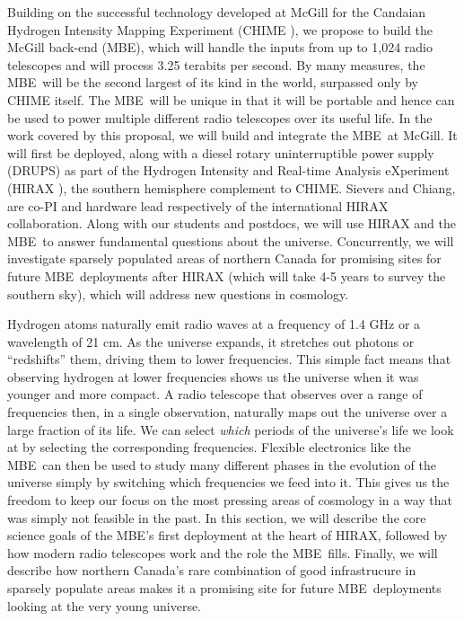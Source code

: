 \documentclass[letterpaper,11pt,preprint]{aastex}
\makeatletter
\newcommand{\mbe}{{\rm MBE}}
\def\section{\@startsection {section}{1}{\z@}{1.0ex plus 
1ex minus .2ex}{.2ex plus .2ex}{\large\bf}}
\makeatother
\begin{document}
Building on the successful technology developed at McGill for the
Candaian Hydrogen Intensity Mapping Experiment (CHIME
\citet{Bandura16}), we propose to build the McGill back-end (\mbe),
which will handle the inputs from up to 1,024 radio telescopes and
will process 3.25 terabits per second.  By many measures, the
\mbe\ will be the second largest of its kind in the world, surpassed
only by CHIME itself.  The \mbe\ will be unique in that it will be
portable and hence can be used to power multiple different radio
telescopes over its useful life. In the work covered by this proposal,
we will build and integrate the \mbe\ at McGill.  It will first be
deployed, along with a diesel rotary uninterruptible power supply
(DRUPS) as part of the Hydrogen Intensity and Real-time Analysis
eXperiment (HIRAX \citet{Newburgh16}), the southern hemisphere
complement to CHIME.
Sievers and Chiang, are co-PI and hardware lead respectively of the
international HIRAX collaboration.  Along with our students and
postdocs, we will use HIRAX and the \mbe\ to answer fundamental questions
about the universe.
Concurrently, we will investigate sparsely populated areas of northern
Canada for promising sites for future \mbe\ deployments after HIRAX
(which will take 4-5 years to survey the southern sky),
which will address new questions in cosmology.

\section{Research/Technology Development}

Hydrogen atoms naturally emit radio waves at a frequency of 1.4 GHz or
a wavelength of 21 cm.  As the universe expands, it stretches out
photons or ``redshifts'' them, driving them to lower frequencies.
This simple fact means that observing hydrogen at lower frequencies
shows us the universe when it was younger and more compact.  A radio
telescope that observes over a range of frequencies then, in a single
observation, naturally maps out the universe over a large fraction of
its life.  We can select {\it{which}} periods of the universe's life
we look at by selecting the corresponding frequencies.  Flexible
electronics like the \mbe\ can then be used to study many different
phases in the evolution of the universe simply by switching which
frequencies we feed into it.  This gives us the freedom to keep our
focus on the most pressing areas of cosmology in a way that was simply
not feasible in the past.  In this section, we will describe the core
science goals of the \mbe's first deployment at the heart of HIRAX,
followed by how modern radio telescopes work and the role the \mbe\ 
fills.  Finally, we will describe how northern Canada's rare
combination of good infrastrucure in sparsely populate areas makes it
a promising site for future \mbe\ deployments looking at the very young
universe.
\end{document}
